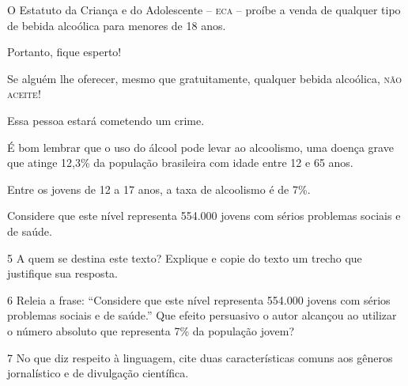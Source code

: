 \begin{myquote}

O Estatuto da Criança e do Adolescente -- \textsc{eca} -- proíbe a venda de
qualquer tipo de bebida alcoólica para menores de 18 anos.

Portanto, fique esperto!

Se alguém lhe oferecer, mesmo que gratuitamente, qualquer bebida
alcoólica, \textsc{não aceite}!

Essa pessoa estará cometendo um crime.

É bom lembrar que o uso do álcool pode levar ao alcoolismo, uma doença
grave que atinge 12,3\% da população brasileira com idade entre 12 e 65
anos.

Entre os jovens de 12 a 17 anos, a taxa de alcoolismo é de 7\%.

Considere que este nível representa 554.000 jovens com sérios problemas
sociais e de saúde.

\end{myquote}


\num{5} A quem se destina este texto? Explique e copie do texto um trecho que 
justifique sua resposta.


\num{6} Releia a frase: ``Considere que este nível representa 554.000 jovens
com sérios problemas sociais e de saúde.'' Que efeito persuasivo o autor 
alcançou ao utilizar o número absoluto que representa 7\% da população jovem?


\num{7} No que diz respeito à linguagem, cite duas características comuns aos
gêneros jornalístico e de divulgação científica.


